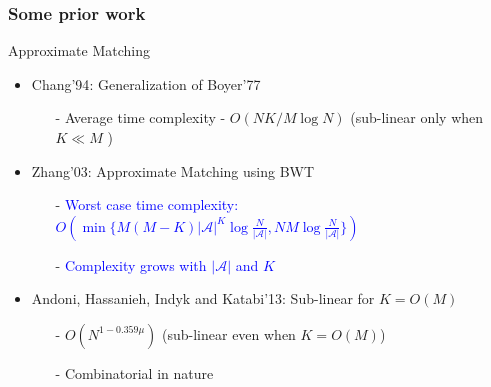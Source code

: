 \documentclass[10pt,xcolor=table]{beamer}
\newcommand{\mc}{\mathcal}
\begin{document}
\begin{frame} \frametitle{Some prior work}
	\vspace{-0.2cm}
	\begin{block}{\alert{Approximate Matching}}
		
	 	\begin{itemize}
	 		\item {Chang'94}: Generalization of Boyer'77
	 		\begin{itemize}
	 			\item[-] Average time complexity - $O(NK/M \log N)$ (sub-linear only when $K \ll M$ )
	 		\end{itemize}
	 		
	 		\item {Zhang'03}: Approximate Matching using BWT
	 			\begin{itemize}
	 				\item[-] \textcolor{blue}{Worst case time complexity: $O(\min\{M(M-K){|\mc{A}|}^K\log \frac{N}{|\mc{A}|} , NM \log \frac{N}{|\mc{A}|}\})$}
	 				\item[-] \textcolor{blue}{Complexity grows with $|\mc{A}|$ and $K$}
	 			\end{itemize}
	 		\pause	
	 		\item {Andoni, Hassanieh, Indyk and Katabi'13}: Sub-linear for $K = O(M)$
	 		\begin{itemize}
                \item[-] \textcolor[rgb]{0.00,0.00,1.00}{$O\left(N^{1-0.359\mu}\right)$ (sub-linear even when $K = O(M)$)}
	 			\item[-] Combinatorial in nature
	 		\end{itemize}
	 	\end{itemize}
	 	
	 \end{block}
\end{frame}
	
\end{document}
